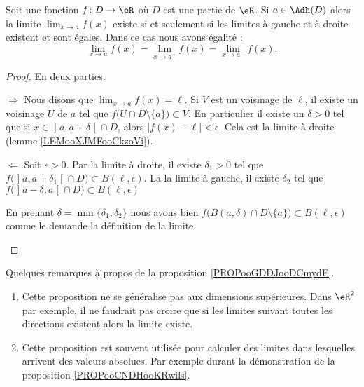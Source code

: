 \begin{proposition}      \label{PROPooGDDJooDCmydE}
    Soit une fonction \( f\colon D\to \eR\) où \( D\) est une partie de \( \eR\). Si \( a\in \Adh(D)\) alors la limite \( \lim_{x\to a} f(x)\) existe si et seulement si les limites à gauche et à droite existent et sont égales. Dans ce cas nous avons égalité :
    \begin{equation}
        \lim_{x\to a} f(x)=\lim_{x\to a^+} f(x)=\lim_{x\to a^-} f(x).
    \end{equation}
\end{proposition}

\begin{proof}
    En deux parties.
    \begin{subproof}
        \item[\( \Rightarrow\)]
        Nous disons que \( \lim_{x\to a} f(x)=\ell\). Si \( V\) est un voisinage de \( \ell\), il existe un voisinage \( U\) de \( a\) tel que \( f\big( U\cap D\setminus \{ a \} \big)\subset V\). En particulier il existe un \( \delta>0\) tel que si \( x\in \mathopen] a , a+\delta \mathclose[\cap D\), alors \( | f(x)-\ell |<\epsilon\). Cela est la limite à droite (lemme \ref{LEMooXJMFooCkzoVi}).
        \item[\( \Leftarrow\)]
        Soit \( \epsilon>0\). Par la limite à droite, il existe \( \delta_1>0\) tel que \( f\big( \mathopen] a , a+\delta_1 \mathclose[\cap D \big)\subset B(\ell,\epsilon)\). La la limite à gauche, il existe \( \delta_2\) tel que \( f\big( \mathopen] a-\delta , a \mathclose[\cap D \big)\subset B(\ell,\epsilon)\)

            En prenant \( \delta=\min\{ \delta_1,\delta_2 \}\) nous avons bien \( f\big( B(a,\delta)\cap D\setminus\{ a \} \big)\subset B(\ell,\epsilon)\) comme le demande la définition de la limite.
    \end{subproof}
\end{proof}

\begin{normaltext}
    Quelques remarques à propos de la proposition \ref{PROPooGDDJooDCmydE}.
    \begin{enumerate}
        \item
    Cette proposition ne se généralise pas aux dimensions supérieures. Dans \( \eR^2\) par exemple, il ne faudrait pas croire que si les limites suivant toutes les directions existent alors la limite existe.
\item
    Cette proposition est souvent utilisée pour calculer des limites dans lesquelles arrivent des valeurs absolues. Par exemple durant la démonstration de la proposition \ref{PROPooCNDHooKRwils}.
    \end{enumerate}
\end{normaltext}


